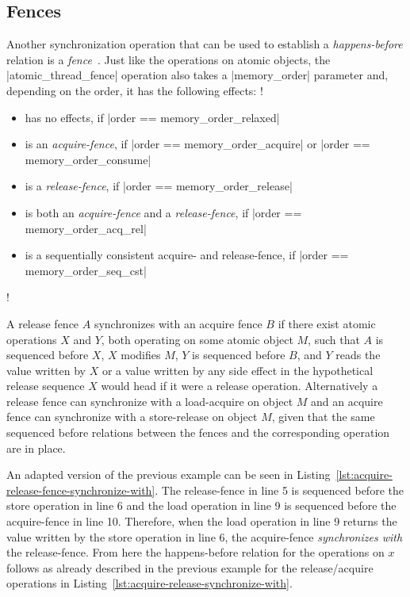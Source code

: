 \documentclass[a4paper,12pt,notitlepage,twoside,openright]{article}
\begin{document}
\subsection{Fences}
\label{sec:Fences}
Another synchronization operation that can be used to establish a
\emph{happens-before} relation is a \emph{fence}~\cite[29.8,
  p.\ 1116]{c++11_standard}. Just like the operations on atomic
objects, the |atomic_thread_fence| operation also takes a
|memory_order| parameter and, depending on the order, it has the
following effects:
\lstMakeShortInline[keywordstyle=\color{black},basicstyle=\fontsize{10}{10}\selectfont\ttfamily]!
\begin{itemize}
	\item has no effects, if
          |order == memory_order_relaxed|
	\item is an \emph{acquire-fence}, if
          |order == memory_order_acquire| or
          |order == memory_order_consume|
	\item is a \emph{release-fence}, if
          |order == memory_order_release|
	\item is both an \emph{acquire-fence} and a
          \emph{release-fence}, if |order == memory_order_acq_rel|
	\item is a sequentially consistent acquire- and
          release-fence, if |order == memory_order_seq_cst|
\end{itemize}
\lstDeleteShortInline!

A release fence $A$ synchronizes with an acquire fence $B$ if there
exist atomic operations $X$ and $Y$, both operating on some atomic
object $M$, such that $A$ is sequenced before $X$, $X$ modifies $M$,
$Y$ is sequenced before $B$, and $Y$ reads the value written by $X$ or
a value written by any side effect in the hypothetical release
sequence $X$ would head if it were a release operation. Alternatively
a release fence can synchronize with a load-acquire on object $M$ and
an acquire fence can synchronize with a store-release on object $M$,
given that the same sequenced before relations between the fences and
the corresponding operation are in place.

An adapted version of the previous example can be seen in
Listing~\ref{lst:acquire-release-fence-synchronize-with}. The
release-fence in line 5 is sequenced before the store operation in
line 6 and the load operation in line 9 is sequenced before the
acquire-fence in line 10. Therefore, when the load operation in line 9
returns the value written by the store operation in line 6, the
acquire-fence \emph{synchronizes with} the release-fence. From here
the happens-before relation for the operations on $x$ follows as
already described in the previous example for the release/acquire
operations in Listing~\ref{lst:acquire-release-synchronize-with}.
\end{document}
